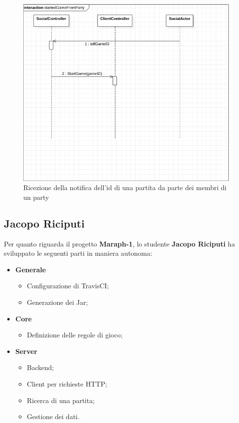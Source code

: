\begin{figure}[H]
	\includegraphics[width=\textwidth,height=\textheight,keepaspectratio]{socialRecieveGame}
	\caption{Ricezione della notifica dell'id di una partita da parte dei membri di un party}
\end{figure}








        \subsection{Jacopo Riciputi}\label{subsec:riciputi}
	   Per quanto riguarda il progetto \textbf{Maraph-1}, lo studente \textbf{Jacopo Riciputi} ha sviluppato le seguenti parti in maniera autonoma:

        \begin{itemize}
        \item \textbf{Generale}
                \begin {itemize}
		\item Configurazione di TravisCI;
		\item Generazione dei Jar;

     	\end {itemize}
         \item \textbf{Core}
                \begin {itemize}
		 \item Definizione delle regole di gioco;

     	\end {itemize}
        \item \textbf{Server}
                \begin {itemize}
		  \item Backend;
	     \item Client per richieste HTTP;
	     \item Ricerca di una partita;
	     \item Gestione dei dati.

     	\end {itemize}

	\end {itemize}

